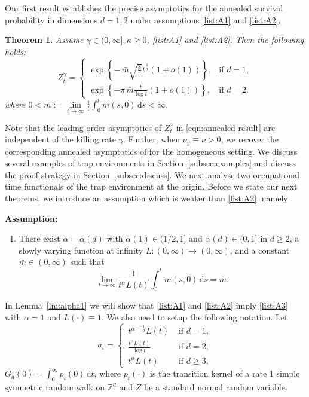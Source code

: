 \documentclass{article}[12pt]
\newtheorem{theorem}{Theorem}[section]
\theoremstyle{definition}
\newcommand{\Z}{\mathbb{Z}}
\newcommand{\1}{\mathbbm{1}}
\newcommand{\dd }{\mathrm{d} }
\begin{document}
Our first result establishes the precise asymptotics for the annealed survival probability in dimensions $d=1,2$ under assumptions \ref{list:A1} and \ref{list:A2}.
\begin{theorem}\label{thm:annealed}
    Assume $\gamma \in (0,\infty],\kappa \ge 0$, {\rm \ref{list:A1}} and {\rm \ref{list:A2}}. Then the following holds:
    \begin{equation}
        Z^{\gamma}_t = \begin{cases}
            \exp\left\{- \, \bar{m}\sqrt{\frac{8}{\pi}}t^{\frac{1}{2}}(1+o(1))\right\},& \text{if }d=1,\\[2mm]
        \exp\left\{- {\pi\,\bar{m}\frac{t}{\log t}(1+o(1))}\right\}, & \text{if } d=2.
        \end{cases}
        \label{eqn:annealed result}
    \end{equation}
    where $
     0< \bar{m}:=\lim\limits_{t\to \infty} \frac{1}{t}\int_0^t m(s,0)\, \dd s <\infty$.
\end{theorem}
Note that the leading-order asymptotics of $Z^\gamma_t$ in \eqref{eqn:annealed result} are independent of the killing rate $\gamma$. Further, when $\nu_y \equiv \nu>0$, we recover the corresponding annealed asymptotics of \cite[Theorem~1.1]{DGRS2012} for the homogeneous setting. We discuss several examples of trap environments in Section~\ref{subsec:examples} and discuss the proof strategy in Section~\ref{subsec:discuss}. 
We next analyse two occupational time functionals of the trap environment at the origin. Before we state our next theorems, we introduce an assumption which is weaker than \ref{list:A2}, namely
 
\textbf{Assumption:}
 \begin{enumerate}[label=(A\arabic*), start=3]
     \item \label{list:A3} There exist $\alpha=\alpha(d)$ with $\alpha(1)\in (1/2,1]$ and $\alpha(d) \in (0,1]$ in $d\ge 2$, a slowly varying function at infinity $L:(0,\infty)\to (0,\infty)$, and a constant $\bar m \in (0,\infty)$ such that
$$
\lim_{t\to\infty}\frac{1}{t^\alpha L(t)}\int_0^t m(s,0)\,\mathrm{d}s=\bar m.
$$
 \end{enumerate}
 In Lemma~\ref{lm:alpha1} we will show that \ref{list:A1} and \ref{list:A2} imply \ref{list:A3} with $\alpha =1$ and $L(\cdot) \equiv 1$.  We also need to setup the following notation. Let
\begin{equation}
    a_t = \begin{cases}
        \,t^{\alpha - \frac{1}{2}}L(t) & \text{ if } d=1,\\
        \,\frac{t^\alpha L(t)}{\log t} & \text{ if } d=2,\\
        \, t^{\alpha}L(t) &\text{ if } d\ge 3,
    \end{cases}
    \label{eqn:defat}
\end{equation}
$G_d(0) = \int_0^\infty p_t(0)\,\dd t$, where $p_t(\cdot)$ is the transition kernel of a rate 1 simple symmetric random walk on $\Z^d$ and $Z$ be a standard normal random variable.
 
\end{document}
